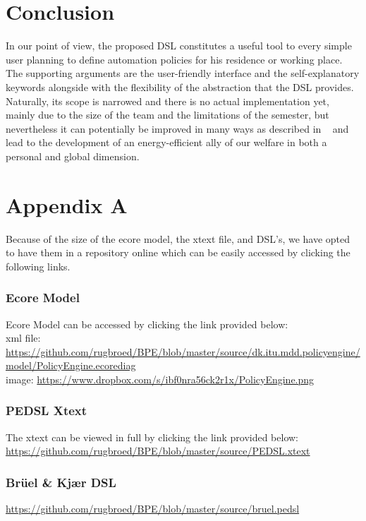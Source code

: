 \documentclass{llncs}
\begin{document}
\section{Conclusion}\label{sec:conclusion}
In our point of view, the proposed DSL constitutes a useful tool to every simple user planning to define automation policies for his residence or working place. The supporting arguments are the user-friendly interface and the self-explanatory keywords alongside with the flexibility of the abstraction that the DSL provides. Naturally, its scope is narrowed and there is no actual implementation yet, mainly due to the size of the team and the limitations of the semester, but nevertheless it can potentially be improved in many ways as described in ~ and lead to the development of an energy-efficient ally of our welfare in both a personal and global dimension. 

{}


\section{Appendix A}\label{sec:appendix-a}
Because of the size of the ecore model, the xtext file, and DSL's, we have opted to have them in a repository online which can be easily accessed by clicking the following links.

\subsubsection{Ecore Model}\label{sec:ecore-model}
Ecore Model can be accessed by clicking the link provided below:
\\xml file:
\url{https://github.com/rugbroed/BPE/blob/master/source/dk.itu.mdd.policyengine/model/PolicyEngine.ecorediag}
\\image:
\url{https://www.dropbox.com/s/ibf0nra56ck2r1x/PolicyEngine.png}
\subsubsection{PEDSL Xtext}\label{sec:xtext-pedsl}
The xtext can be viewed in full by clicking the link provided below:\\
\url{https://github.com/rugbroed/BPE/blob/master/source/PEDSL.xtext}

\subsubsection{Br\"{u}el \& Kj\ae r DSL}\label{sec:dsl-bruel}
\url{https://github.com/rugbroed/BPE/blob/master/source/bruel.pedsl}
\end{document}
